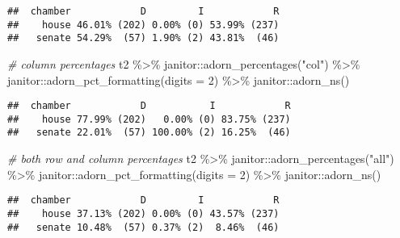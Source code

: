 \documentclass[
]{book}
\newenvironment{Shaded}{\begin{snugshade}}{\end{snugshade}}
\newcommand{\AttributeTok}[1]{\textcolor[rgb]{0.77,0.63,0.00}{#1}}
\newcommand{\CommentTok}[1]{\textcolor[rgb]{0.56,0.35,0.01}{\textit{#1}}}
\newcommand{\DecValTok}[1]{\textcolor[rgb]{0.00,0.00,0.81}{#1}}
\newcommand{\FunctionTok}[1]{\textcolor[rgb]{0.00,0.00,0.00}{#1}}
\newcommand{\NormalTok}[1]{#1}
\newcommand{\SpecialCharTok}[1]{\textcolor[rgb]{0.00,0.00,0.00}{#1}}
\newcommand{\StringTok}[1]{\textcolor[rgb]{0.31,0.60,0.02}{#1}}
\begin{document}
\begin{verbatim}
##  chamber            D         I            R
##    house 46.01% (202) 0.00% (0) 53.99% (237)
##   senate 54.29%  (57) 1.90% (2) 43.81%  (46)
\end{verbatim}

\begin{Shaded}
\begin{Highlighting}[]
\CommentTok{\# column percentages}
\NormalTok{t2 }\SpecialCharTok{\%\textgreater{}\%}
\NormalTok{  janitor}\SpecialCharTok{::}\FunctionTok{adorn\_percentages}\NormalTok{(}\StringTok{"col"}\NormalTok{) }\SpecialCharTok{\%\textgreater{}\%}
\NormalTok{  janitor}\SpecialCharTok{::}\FunctionTok{adorn\_pct\_formatting}\NormalTok{(}\AttributeTok{digits =} \DecValTok{2}\NormalTok{) }\SpecialCharTok{\%\textgreater{}\%}
\NormalTok{  janitor}\SpecialCharTok{::}\FunctionTok{adorn\_ns}\NormalTok{()}
\end{Highlighting}
\end{Shaded}

\begin{verbatim}
##  chamber            D           I            R
##    house 77.99% (202)   0.00% (0) 83.75% (237)
##   senate 22.01%  (57) 100.00% (2) 16.25%  (46)
\end{verbatim}

\begin{Shaded}
\begin{Highlighting}[]
\CommentTok{\# both row and column percentages}
\NormalTok{t2 }\SpecialCharTok{\%\textgreater{}\%}
\NormalTok{  janitor}\SpecialCharTok{::}\FunctionTok{adorn\_percentages}\NormalTok{(}\StringTok{"all"}\NormalTok{) }\SpecialCharTok{\%\textgreater{}\%}
\NormalTok{  janitor}\SpecialCharTok{::}\FunctionTok{adorn\_pct\_formatting}\NormalTok{(}\AttributeTok{digits =} \DecValTok{2}\NormalTok{) }\SpecialCharTok{\%\textgreater{}\%}
\NormalTok{  janitor}\SpecialCharTok{::}\FunctionTok{adorn\_ns}\NormalTok{()}
\end{Highlighting}
\end{Shaded}

\begin{verbatim}
##  chamber            D         I            R
##    house 37.13% (202) 0.00% (0) 43.57% (237)
##   senate 10.48%  (57) 0.37% (2)  8.46%  (46)
\end{verbatim}
\end{document}
